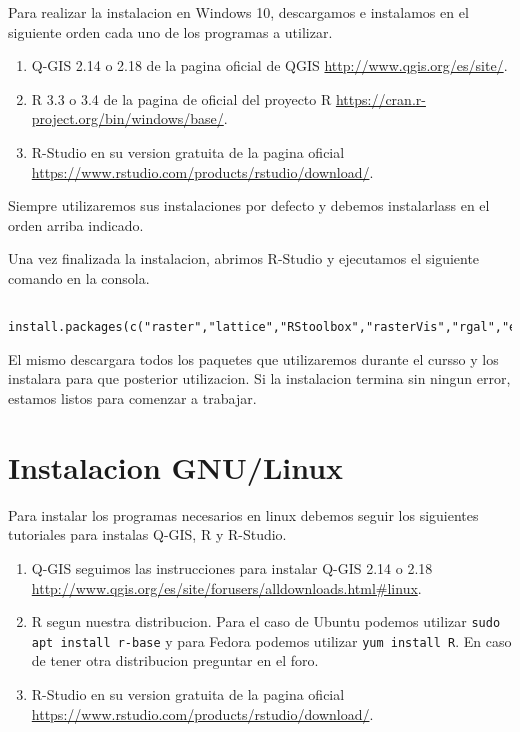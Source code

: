 Para realizar la instalacion en Windows 10, descargamos e instalamos en el siguiente orden cada uno de los programas a utilizar.

\begin{enumerate}
  \item Q-GIS 2.14 o 2.18 de la pagina oficial de QGIS \url{http://www.qgis.org/es/site/}.
  \item R 3.3 o 3.4 de la pagina de oficial del proyecto R \url{https://cran.r-project.org/bin/windows/base/}.
  \item R-Studio en su version gratuita de la pagina oficial \url{https://www.rstudio.com/products/rstudio/download/}.
\end{enumerate}

Siempre utilizaremos sus instalaciones por defecto y debemos instalarlass en el orden arriba indicado.

Una vez finalizada la instalacion, abrimos R-Studio y ejecutamos el siguiente comando en la consola.

\begin{lstlisting}
  install.packages(c("raster","lattice","RStoolbox","rasterVis","rgal","e1071","randomForest","kernlab"))
\end{lstlisting}

El mismo descargara todos los paquetes que utilizaremos durante el cursso y los instalara para que posterior utilizacion. Si la instalacion termina sin ningun error, estamos listos para comenzar a trabajar.

\section{Instalacion GNU/Linux}

Para instalar los programas necesarios en linux debemos seguir los siguientes tutoriales para instalas Q-GIS, R y R-Studio.

\begin{enumerate}
  \item Q-GIS seguimos las instrucciones para instalar Q-GIS 2.14 o 2.18 \url{http://www.qgis.org/es/site/forusers/alldownloads.html#linux}.
  \item R segun nuestra distribucion. Para el caso de Ubuntu podemos utilizar \texttt{sudo apt install r-base} y para Fedora podemos utilizar \texttt{yum install R}. En caso de tener otra distribucion preguntar en el foro.
  \item R-Studio en su version gratuita de la pagina oficial \url{https://www.rstudio.com/products/rstudio/download/}.
\end{enumerate}

